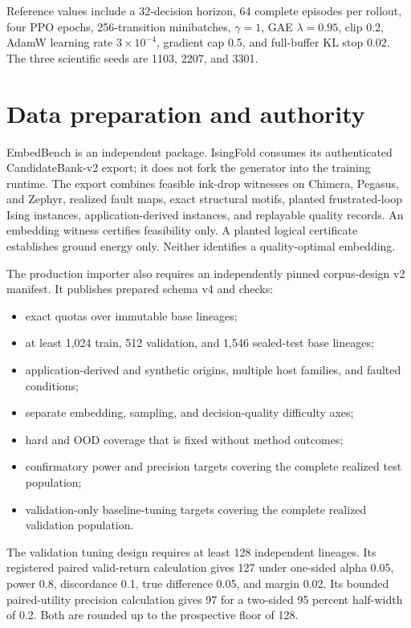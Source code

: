 \documentclass[
  american,
  10pt,
  a4paper,
]{article}
\providecommand{\tightlist}{%
  \setlength{\itemsep}{0pt}\setlength{\parskip}{0pt}}
\begin{document}
Reference values include a 32-decision horizon, 64 complete episodes per
rollout, four PPO epochs, 256-transition minibatches, \(\gamma=1\), GAE
\(\lambda=0.95\), clip 0.2, AdamW learning rate \(3\times10^{-4}\),
gradient cap 0.5, and full-buffer KL stop 0.02. The three scientific
seeds are 1103, 2207, and 3301.

\section{Data preparation and
authority}\label{data-preparation-and-authority}

EmbedBench is an independent package. IsingFold consumes its
authenticated CandidateBank-v2 export; it does not fork the generator
into the training runtime. The export combines feasible ink-drop
witnesses on Chimera, Pegasus, and Zephyr, realized fault maps, exact
structural motifs, planted frustrated-loop Ising instances,
application-derived instances, and replayable quality records. An
embedding witness certifies feasibility only. A planted logical
certificate establishes ground energy only. Neither identifies a
quality-optimal embedding.

The production importer also requires an independently pinned
corpus-design v2 manifest. It publishes prepared schema v4 and checks:

\begin{itemize}
\tightlist
\item
  exact quotas over immutable base lineages;
\item
  at least 1,024 train, 512 validation, and 1,546 sealed-test base
  lineages;
\item
  application-derived and synthetic origins, multiple host families, and
  faulted conditions;
\item
  separate embedding, sampling, and decision-quality difficulty axes;
\item
  hard and OOD coverage that is fixed without method outcomes;
\item
  confirmatory power and precision targets covering the complete
  realized test population;
\item
  validation-only baseline-tuning targets covering the complete realized
  validation population.
\end{itemize}

The validation tuning design requires at least 128 independent lineages.
Its registered paired valid-return calculation gives 127 under one-sided
alpha 0.05, power 0.8, discordance 0.1, true difference 0.05, and margin
0.02. Its bounded paired-utility precision calculation gives 97 for a
two-sided 95 percent half-width of 0.2. Both are rounded up to the
prospective floor of 128.
\end{document}
